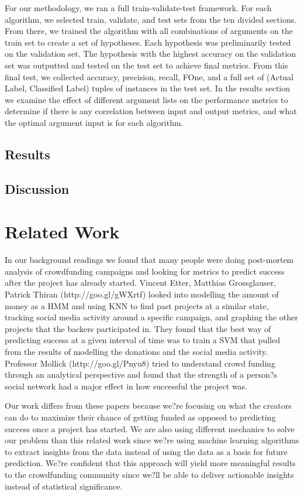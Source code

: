 \documentclass{article}
\begin{document}
For our methodology, we ran a full train-validate-test framework. For each algorithm, we selected train, validate, and test sets from the ten divided sections. From there, we trained the algorithm with all combinations of arguments on the train set to create a set of hypotheses. Each hypothesis was preliminarily tested on the validation set. The hypothesis with the highest accuracy on the validation set was outputted and tested on the test set to achieve final metrics. From this final test, we collected accuracy, precision, recall, FOne, and a full set of (Actual Label, Classified Label) tuples of instances in the test set. In the results section we examine the effect of different argument lists on the performance metrics to determine if there is any correlation between input and output metrics, and what the optimal argument input is for each algorithm. 

\subsection{Results}

\subsection{Discussion}

\section{Related Work}
In our background readings we found that many people were doing post-mortem analysis of crowdfunding campaigns and looking for metrics to predict success after the project has already started. Vincent Etter, Matthias Grossglauser, Patrick Thiran (http://goo.gl/gWXrtf) looked into modelling the amount of money as a HMM and using KNN to find past projects at a similar state, tracking social media activity around a specific campaign, and graphing the other projects that the backers participated in. They found that the best way of predicting success at a given interval of time was to train a SVM that pulled from the results of modelling the donations and the social media activity. Professor Mollick (http://goo.gl/Pnyu8) tried to understand crowd funding through an analytical perspective and found that the strength of a person?s social network had a major effect in how successful the project was. 

Our work differs from these papers because we?re focusing on what the creators can do to maximize their chance of getting funded as opposed to predicting success once a project has started. We are also using different mechanics to solve our problem than this related work since we?re using machine learning algorithms to extract insights from the data instead of using the data as a basis for future prediction. We?re confident that this approach will yield more meaningful results to the crowdfunding community since we?ll be able to deliver actionable insights instead of statistical significance.
\end{document}
